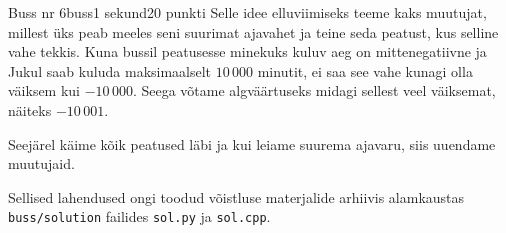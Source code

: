 \begin{yl}{1}{Buss nr 6}{buss}{1 sekund}{20 punkti}
  Selle idee elluviimiseks teeme kaks muutujat, millest üks peab meeles seni suurimat ajavahet ja teine seda peatust, kus selline vahe tekkis. Kuna bussil peatusesse minekuks kuluv aeg on mittenegatiivne ja Jukul saab kuluda maksimaalselt $10\,000$ minutit, ei saa see vahe kunagi olla väiksem kui $-10\,000$. Seega võtame algväärtuseks midagi sellest veel väiksemat, näiteks $-10\,001$.

  Seejärel käime kõik peatused läbi ja kui leiame suurema ajavaru, siis uuendame muutujaid.

  Sellised lahendused ongi toodud võistluse materjalide arhiivis alamkaustas \verb'buss/solution' failides \verb'sol.py' ja \verb'sol.cpp'.
\end{yl}
